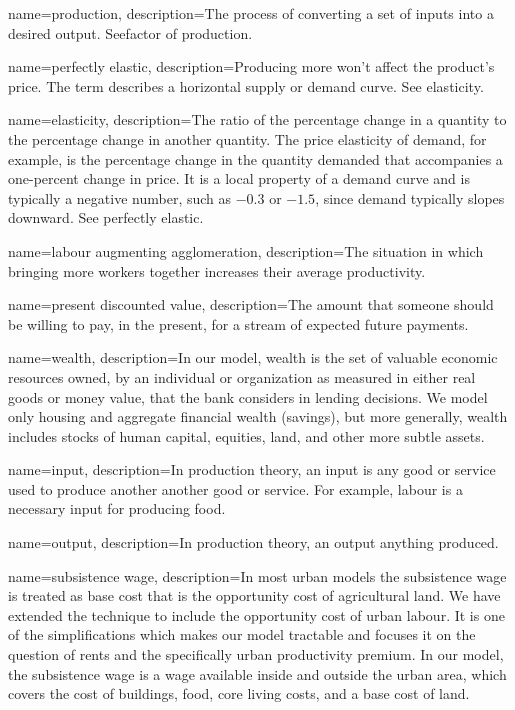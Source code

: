 {
name=production,
description={The process of converting a set of \glspl{input} into a desired \gls{output}. See\gls{factor of production}.}
}

{
name=perfectly elastic,
description={Producing more won't affect the product's price. The term describes a  horizontal supply or demand curve. See \gls{elasticity}.} %
}

{
name=elasticity,
description={The ratio of the percentage change in a quantity to the percentage change in another quantity. The price elasticity of demand, for  example, is the percentage change in the quantity demanded that accompanies a one-percent change in price. It is a local property of a demand curve and is typically  a negative number, such as $-0.3$ or $-1.5$, since demand typically slopes downward. See \gls{perfectly elastic}.}
}

{
name=labour augmenting agglomeration,
description={The situation in which bringing more workers together increases their average productivity.}
}

{
name=present discounted value,
description={The amount that someone should be willing to pay, in the present, for a stream of expected future payments.}
}

{
name=wealth,
description={In our model, wealth is the set of valuable economic resources owned, by an individual or organization as measured in either real goods or money value, that the bank considers in lending decisions. We model only housing and aggregate financial wealth (savings), but more generally, wealth includes stocks of human capital, equities, land, and other more subtle assets.}
}

{
name=input,
description={In production theory, an input is any good or service used to produce another another good or service. %
For example, labour is a necessary input for producing food. }
}

{
name=output,
description={In production theory, an output anything produced.} %
}

{
name=subsistence wage,
description={In most urban models the subsistence wage is treated as base cost that is the opportunity cost of agricultural land. We have extended the technique to include the opportunity cost of urban labour. It is one of the simplifications which makes our model tractable and focuses it on the question of rents and the specifically urban productivity premium. In our model, the subsistence wage is a wage available inside and outside the urban area, which covers the cost of buildings, food, core living costs, and a base cost of land.}
}

